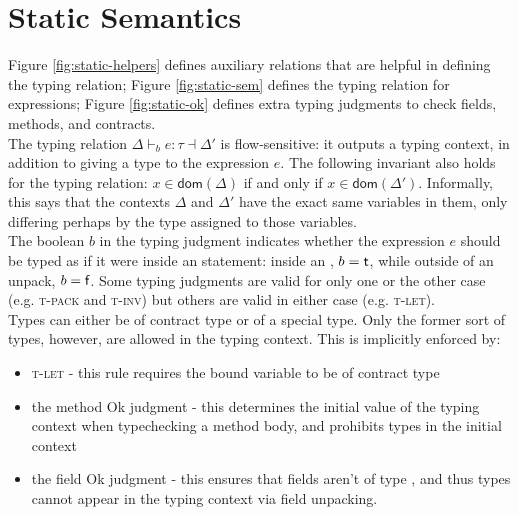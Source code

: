 \documentclass[runningheads,a4paper]{llncs}
\begin{document}
\fi

\section{Static Semantics}

\newcommand{\okHelp}{\textsf{Ok}}
\newcommand{\okInHelp}{\textsf{Ok\ in}}

Figure \ref{fig:static-helpers} defines auxiliary relations that are helpful in defining the typing relation; Figure \ref{fig:static-sem} defines the typing relation for expressions; Figure \ref{fig:static-ok} defines extra typing judgments to check fields, methods, and contracts.\\


The typing relation $\Delta \vdash_{b} e : \tau \dashv \Delta'$ is flow-sensitive: it outputs a typing context, in addition to giving a type to the expression $e$. The following invariant also holds for the typing relation: $x \in \textsf{dom}(\Delta)$ if and only if $x \in \textsf{dom}(\Delta')$. Informally, this says that the contexts $\Delta$ and $\Delta'$ have the exact same variables in them, only differing perhaps by the type assigned to those variables.\\

The boolean $b$ in the typing judgment indicates whether the expression $e$ should be typed as if it were inside an \unpackS{} statement: inside an \unpackS{}, $b = \textsf{t}$, while outside of an unpack, $b = \textsf{f}$. Some typing judgments are valid for only one or the other case (e.g. \textsc{t-pack} and \textsc{t-inv}) but others are valid in either case (e.g. \textsc{t-let}).\\

Types can either be of contract type or of a special \packS{} type. Only the former sort of types, however, are allowed in the typing context. This is implicitly enforced by:

\begin{itemize}
\item \textsc{t-let} - this rule requires the bound variable to be of contract type
\item the method \okHelp{} judgment - this determines the initial value of the typing context when typechecking a method body, and prohibits \packS{} types in the initial context
\item the field \okHelp{} judgment - this ensures that fields aren't of type \packS{}, and thus \packS{} types cannot appear in the typing context via field unpacking.
\end{itemize}
\end{document}
